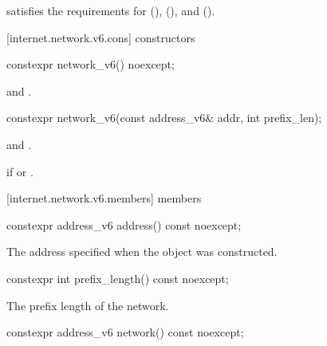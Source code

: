 \pnum
{} satisfies the requirements for  (),  (), and  ().


[internet.network.v6.cons]{ constructors}

\begin{itemdecl}
constexpr network_v6() noexcept;
\end{itemdecl}

\begin{itemdescr}
\pnum
\postconditions {} and .
\end{itemdescr}

\begin{itemdecl}
constexpr network_v6(const address_v6& addr, int prefix_len);
\end{itemdecl}

\begin{itemdescr}
\pnum
\postconditions {} and .

\pnum
\remarks {} if  or .
\end{itemdescr}



[internet.network.v6.members]{ members}

\begin{itemdecl}
constexpr address_v6 address() const noexcept;
\end{itemdecl}

\begin{itemdescr}
\pnum
\returns The address specified when the  object was constructed.
\end{itemdescr}

\begin{itemdecl}
constexpr int prefix_length() const noexcept;
\end{itemdecl}

\begin{itemdescr}
\pnum
\returns The prefix length of the network.
\end{itemdescr}

\begin{itemdecl}
constexpr address_v6 network() const noexcept;
\end{itemdecl}

